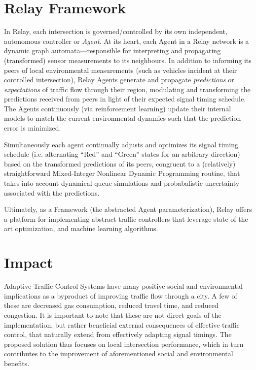 \documentclass[a4paper,11pt]{article}
\begin{document}
\begin{multicols}{2}
\section{Relay Framework}

In Relay, each intersection is governed/controlled by its own independent, autonomous controller or \emph{Agent}.
At its heart, each Agent in a Relay network is a dynamic graph automata---responsible for interpreting and propagating (transformed) sensor measurements to its neighbours.
In addition to informing its peers of local environmental measurements (such as vehicles incident at their controlled intersection), Relay Agents generate and propagate \emph{predictions} or \emph{expectations} of traffic flow through their region, modulating and transforming the predictions received from peers in light of their expected signal timing schedule.
The Agents continuously (via reinforcement learning) update their internal models to match the current environmental dynamics such that the prediction error is minimized.

Simultaneously each agent continually adjusts and optimizes its signal timing schedule (i.e. alternating ``Red'' and ``Green'' states for an arbitrary direction) based on the transformed predictions of its peers, congruent to a (relatively) straightforward Mixed-Integer Nonlinear Dynamic Programming routine, that takes into account dynamical queue simulations and probabalistic uncertainty associated with the predictions.

Ultimately, as a Framework (the abstracted Agent parameterization), Relay offers a platform for implementing abstract traffic controllers that leverage state-of-the art optimization, and machine learning algorithms.


\section{Impact}
Adaptive Traffic Control Systems have many positive social and environmental implications as a byproduct of improving traffic flow through a city.
A few of these are decreased gas consumption, reduced travel time, and reduced congestion.
It is important to note that these are not direct goals of the implementation, but rather beneficial external consequences of effective traffic control, that naturally extend from effectively adapting signal timings.
The proposed solution thus focuses on local intersection performance, which in turn contributes to the improvement of aforementioned social and environmental benefits.


\end{multicols}
\end{document}
